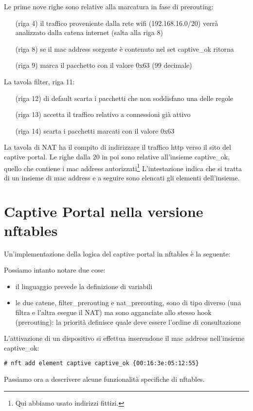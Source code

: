 Le prime nove righe sono relative alla marcatura in fase di prerouting:
\begin{itemize}[itemindent=2em]
    \item[(riga 4)] il traffico proveniente dalla rete wifi (192.168.16.0/20)
    verrà analizzato dalla catena internet (salta alla riga 8)
    \item[(riga 8)] se il mac address sorgente è contenuto nel set captive\_ok
    ritorna
    \item[(riga 9)] marca il pacchetto con il valore 0x63 (99 decimale)
  \end{itemize}
  La tavola filter, riga 11:
  \begin{itemize}[itemindent=2em]
    \item[(riga 12)] di default scarta i pacchetti che non soddisfano una delle regole
    \item[(riga 13)] accetta il traffico relativo a connessioni già attivo
    \item[(riga 14)] scarta i pacchetti marcati con il valore 0x63
\end{itemize}
La tavola di NAT ha il compito di indirizzare il traffico http verso il sito
del captive portal.
Le righe dalla $20$ in poi sono relative all'insieme captive\_ok, quello che contiene i mac
address autorizzati\footnote{Qui abbiamo usato indirizzi fittizi.}
L'intestazione indica che si tratta di un insieme di mac address e a
seguire sono elencati gli elementi dell'insieme.

\section{Captive Portal nella versione nftables}
Un'implementazione della logica del captive portal in nftables è la seguente:

Possiamo intanto notare due cose:
\begin{itemize}
	\item il linguaggio prevede la definizione di variabili
	
	\item le due catene, filter\_prerouting e nat\_prerouting, sono di tipo diverso
	(una filtra e l'altra esegue il NAT) ma sono agganciate allo stesso hook
    (prerouting): la priorità definisce quale deve essere l'ordine di consultazione
\end{itemize}
L'attivazione di un dispositivo si effettua inserendone il mac address nell'insieme
captive\_ok:
\begin{lstlisting}
# nft add element captive captive_ok {00:16:3e:05:12:55}
\end{lstlisting}
Passiamo ora a descrivere alcune funzionalità specifiche di nftables.

